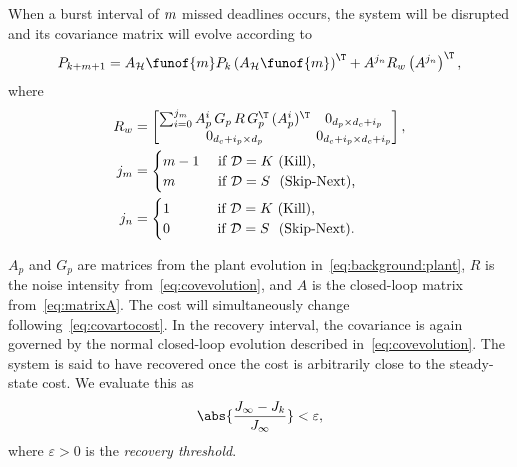 When a burst interval of $m$ missed deadlines occurs, the system will be disrupted and its covariance matrix will evolve according to
%
\begin{equation}
\label{eq:covariance-evolution}
    P_{k+\nummisses+1} = A_{\strat}\funof{m} P_k \left( A_{\strat}\funof{m} \right)^\T + A^{j_{\numhits}} R_w \left( A^{j_{\numhits}} \right)^\T,
\end{equation}
where
\begin{equation}
\label{eq:evolutionparameters}
\setlength\arraycolsep{2pt}
    \begin{aligned}
        R_w &= 
        \begin{bmatrix} 
            \sum_{i=0}^{j_{\nummisses}} A_p^i\,G_p\,R\,G_p^\T\,(A_p^i)^\T & 0_{\numstatesplant \times \numstatesctl+\numinputplant} \\ 
            0_{\numstatesctl + \numinputplant \times \numstatesplant}               & 0_{\numstatesctl + \numinputplant \times \numstatesctl+ \numinputplant}
        \end{bmatrix}, \\
        j_{\nummisses} &= 
        \begin{cases} 
            \nummisses - 1 & \text{ if } \dstrat = K\,\, \text{(Kill),} \\ 
            \nummisses & \text{ if } \dstrat = S\,\,\,\, \text{(Skip-Next),} 
        \end{cases} \\
        j_{\numhits} &= 
        \begin{cases} 
            1 \phantom{||222} & \text{ if } \dstrat = K\,\, \text{(Kill),} \\ 
            0 & \text{ if } \dstrat = S\,\,\,\, \text{(Skip-Next).}
        \end{cases}
        \end{aligned}
\end{equation}

$A_p$ and $G_p$ are matrices from the plant evolution in~\eqref{eq:background:plant}, $R$ is the noise intensity from~\eqref{eq:covevolution}, and $A$ is the closed-loop matrix from~\eqref{eq:matrixA}.
The cost will simultaneously change following~\eqref{eq:covartocost}.
In the recovery interval, the covariance is again governed by the normal closed-loop evolution described in~\eqref{eq:covevolution}.
The system is said to have recovered once the cost is arbitrarily close to the steady-state cost.
We evaluate this as
%
\begin{equation}
    \label{eq:cost-threshold}
    \abs{\frac{J_{\infty}-J_k}{J_\infty}} < \varepsilon,
\end{equation}
where $\varepsilon> 0$ is the \emph{recovery threshold}.

